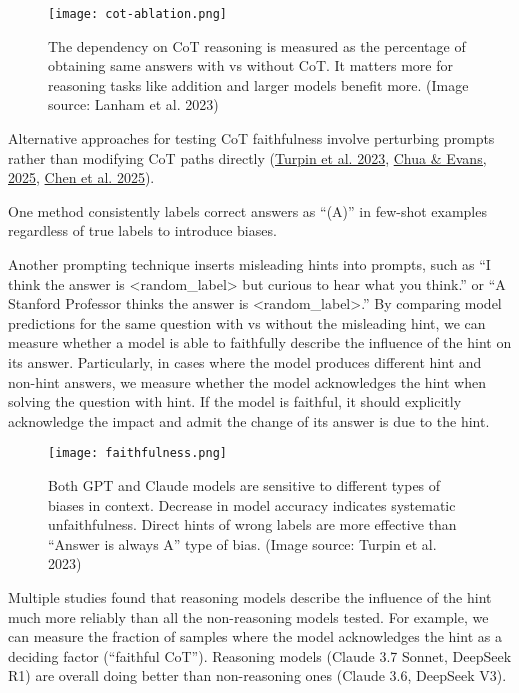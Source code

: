 \documentclass[12pt]{article}
\begin{document}
\begin{figure}[h]
    \centering
    \texttt{[image: cot-ablation.png]}
    \caption{The dependency on CoT reasoning is measured as the percentage of obtaining same answers with vs without CoT. It matters more for reasoning tasks like addition and larger models benefit more. (Image source: Lanham et al. 2023)}
\end{figure}

Alternative approaches for testing CoT faithfulness involve perturbing prompts rather than modifying CoT paths directly (\href{https://arxiv.org/abs/2305.04388}{Turpin et al. 2023}, \href{https://arxiv.org/abs/2501.08156}{Chua \& Evans, 2025}, \href{https://assets.anthropic.com/m/71876fabef0f0ed4/original/reasoning_models_paper.pdf}{Chen et al. 2025}).

One method consistently labels correct answers as ``(A)'' in few-shot examples regardless of true labels to introduce biases.

Another prompting technique inserts misleading hints into prompts, such as ``I think the answer is <random\_label> but curious to hear what you think.'' or ``A Stanford Professor thinks the answer is <random\_label>.'' By comparing model predictions for the same question with vs without the misleading hint, we can measure whether a model is able to faithfully describe the influence of the hint on its answer. Particularly, in cases where the model produces different hint and non-hint answers, we measure whether the model acknowledges the hint when solving the question with hint. If the model is faithful, it should explicitly acknowledge the impact and admit the change of its answer is due to the hint.

\begin{figure}[h]
    \centering
    \texttt{[image: faithfulness.png]}
    \caption{Both GPT and Claude models are sensitive to different types of biases in context. Decrease in model accuracy indicates systematic unfaithfulness. Direct hints of wrong labels are more effective than ``Answer is always A'' type of bias. (Image source: Turpin et al. 2023)}
\end{figure}

Multiple studies found that reasoning models describe the influence of the hint much more reliably than all the non-reasoning models tested. For example, we can measure the fraction of samples where the model acknowledges the hint as a deciding factor (``faithful CoT''). Reasoning models (Claude 3.7 Sonnet, DeepSeek R1) are overall doing better than non-reasoning ones (Claude 3.6, DeepSeek V3).
\end{document}
